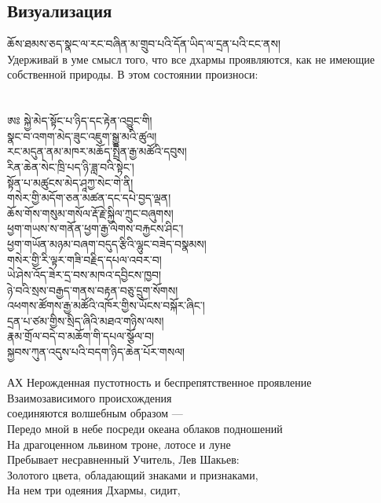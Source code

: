 \subsection{Визуализация}
\scriptsize
\ti
ཆོས་ཐམས་ཅད་སྣང་ལ་རང་བཞིན་མ་གྲུབ་པའི་དོན་ཡིད་ལ་དྲན་པའི་ངང་ནས།\\
\ru
Удерживай в уме смысл того, что все дхармы проявляются,
как не имеющие собственной природы. В этом состоянии произноси:\\
\\
\\
\normalsize
\ti
ཨཿ སྐྱེ་མེད་སྟོང་པ་ཉིད་དང་རྟེན་འབྱུང་གི།\\
སྣང་བ་འགག་མེད་ཟུང་འཇུག་སྒྱུ་མའི་ཚུལ།\\
རང་མདུན་ནམ་མཁར་མཆོད་སྤྲིན་རྒྱ་མཚོའི་དབུས།\\
རིན་ཆེན་སེང་ཁྲི་པད་ཉི་ཟླ་བའི་སྟེང་།\\
སྟོན་པ་མཚུངས་མེད་ཤཱཀྱ་སེང་གེ་ནི།\\
གསེར་གྱི་མདོག་ཅན་མཚན་དང་དཔེ་བྱད་ལྡན།\\
ཆོས་གོས་གསུམ་གསོལ་རྡོ་རྗེ་སྐྱིལ་ཀྲུང་བཞུགས།\\
ཕྱག་གཡས་ས་གནོན་ཕྱག་རྒྱ་ལེགས་བརྐྱངས་ཤིང་།\\
ཕྱག་གཡོན་མཉམ་བཞག་བདུད་རྩིའི་ལྷུང་བཟེད་བསྣམས།\\
གསེར་གྱི་རི་ལྟར་གཟི་བརྗིད་དཔལ་འབར་བ།\\
ཡེ་ཤེས་འོད་ཟེར་དྲ་བས་མཁའ་དབྱིངས་ཁྱབ།\\
ཉེ་བའི་སྲས་བརྒྱད་གནས་བརྟན་བཅུ་དྲུག་སོགས། \\
འཕགས་ཚོགས་རྒྱ་མཚོའི་འཁོར་གྱིས་ཡོངས་བསྐོར་ཞིང་།\\
དྲན་པ་ཙམ་གྱིས་སྲིད་ཞིའི་མཐའ་གཉིས་ལས། \\
རྣམ་གྲོལ་བདེ་བ་མཆོག་གི་དཔལ་སྩོལ་བ། \\
སྐྱབས་ཀུན་འདུས་པའི་བདག་ཉིད་ཆེན་པོར་གསལ།\\
\\
\ru
АХ Нерожденная пустотность и беспрепятственное проявление\\
Взаимозависимого происхождения \\
соединяются волшебным образом —\\
Передо мной в небе посреди океана облаков подношений\\
На драгоценном львином троне, лотосе и луне\\
Пребывает несравненный Учитель, Лев Шакьев:\\
\newpage
Золотого цвета, обладающий знаками и признаками,\\
На нем три одеяния Дхармы, сидит,\\
